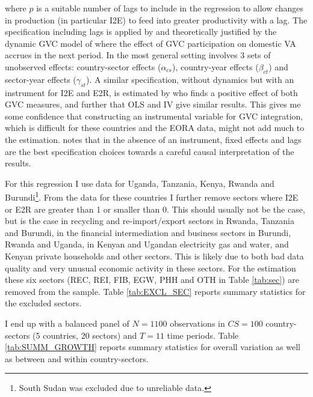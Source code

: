 \documentclass[a4paper]{article}
\begin{document}
\noindent where $p$ is a suitable number of lags to include in the regression to allow changes in production (in particular I2E) to feed into greater productivity with a lag. The specification including lags is applied by \citet{kummritz2015global} and theoretically justified by the dynamic GVC model of \citet{LiLiu2015moving} where the effect of GVC participation on domestic VA accrues in the next period. In the most general setting involves 3 sets of unobserved effects: country-sector effects ($\alpha_{cs}$), country-year effects ($\beta_{ct}$) and sector-year effects ($\gamma_{st}$). A similar specification, without dynamics but with an instrument for I2E and E2R, is estimated by \citet{Kummritz20161} who finds a positive effect of both GVC measures, and further that OLS and IV give similar results. This gives me some confidence that constructing an instrumental variable for GVC integration, which is difficult for these countries and the EORA data, might not add much to the estimation. \citet{kummritz2015global} notes that in the absence of an instrument, fixed effects and lags are the best specification choices towards a careful causal interpretation of the results.  \newline

For this regression I use data for Uganda, Tanzania, Kenya, Rwanda and Burundi\footnote{South Sudan was excluded due to unreliable data.}. From the data for these countries I further remove sectors where I2E or E2R are greater than 1 or smaller than 0. This should usually not be the case, but is the case in recycling and re-import/export sectors in Rwanda, Tanzania and Burundi, in the financial intermediation and business sectors in Burundi, Rwanda and Uganda, in Kenyan and Ugandan electricity gas and water, and Kenyan private households and other sectors. This is likely due to both bad data quality and very unusual economic activity in these sectors. For the estimation these six sectors (REC, REI, FIB, EGW, PHH and OTH in Table \ref{tab:sec}) are removed from the sample. %
Table \ref{tab:EXCL_SEC} reports summary statistics for the excluded sectors. \newline


I end up with a balanced panel of $N = 1100$ observations in $CS = 100$ country-sectors (5 countries, 20 sectors) and $T = 11$ time periods. Table \ref{tab:SUMM_GROWTH} reports summary statistics for overall variation as well as between and within country-sectors. %
\end{document}

